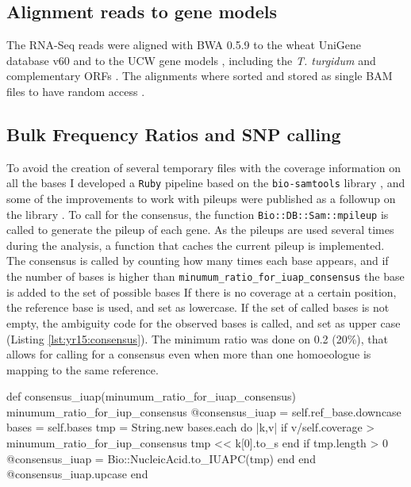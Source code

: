 \subsection{Alignment reads to gene models}
The RNA-Seq reads were aligned with BWA 0.5.9 \citep{Li2009} to the wheat UniGene database v60 \citep{PontiusJUWagnerL2002} and to the UCW gene models \citep{Krasileva2013}, including the \textit{T. turgidum} and complementary ORFs \citep{MASWheat2013}.
The alignments where sorted and stored as single BAM files to have random access \citep{Li2009a}. 


\subsection{Bulk Frequency Ratios and SNP calling}
\label{yr15:sub:bfr}
To avoid the creation of several temporary files with the coverage information on all the bases I developed a \texttt{Ruby} pipeline based on the \texttt{bio-samtools} library \citep{Ramirez-Gonzalez2012}, and some of the improvements to work with pileups were published as a followup on the library \citep{Etherington2015}.
To call for the consensus, the function \texttt{Bio::DB::Sam::mpileup} is called to generate the pileup of each gene. 
As the pileups are used several times during the analysis, a function that caches the current pileup is implemented.
The consensus is called by counting how many times each base appears, and if the number of bases is higher than \texttt{minumum\_ratio\_for\_iuap\_consensus} the base is added to the set of possible bases \citep{Cornish-Bowden1985} 
If there is no coverage at a certain position, the reference base is used, and set as lowercase. 
If the set of called bases is not empty, the ambiguity code for the observed bases is called, and set as upper case (Listing \ref{lst:yr15:consensus}).
The minimum ratio was done on 0.2 (20\%), that allows for calling for a consensus even when more than one homoeologue is mapping to the same reference.

\begin{code}[language=Ruby,caption=Method to call for the consensus on progenitors from a pileup, label=lst:yr15:consensus]
def consensus_iuap(minumum_ratio_for_iuap_consensus)
  minumum_ratio_for_iup_consensus
  @consensus_iuap = self.ref_base.downcase
  bases = self.bases
  tmp = String.new
  bases.each do |k,v|
    if v/self.coverage > minumum_ratio_for_iup_consensus
      tmp << k[0].to_s
    end 
    if tmp.length > 0
      @consensus_iuap = Bio::NucleicAcid.to_IUAPC(tmp)
    end
  end 
  @consensus_iuap.upcase
end
\end{code}

